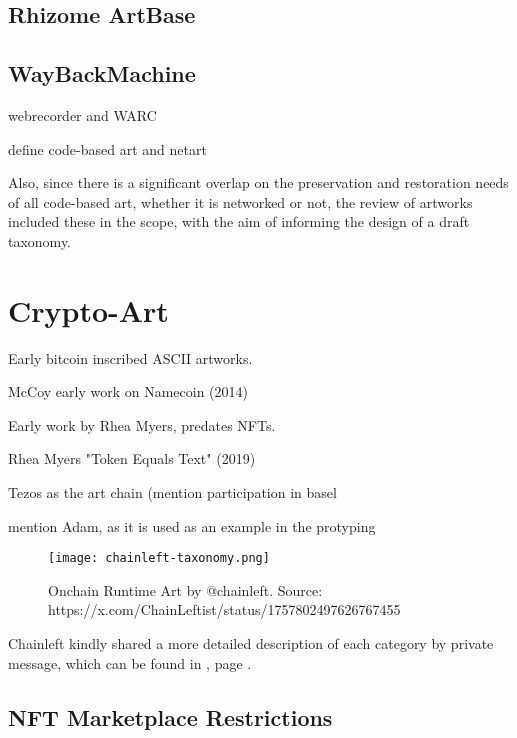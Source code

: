 \subsection{Rhizome ArtBase}


\subsection{WayBackMachine}

webrecorder and WARC





\todo define code-based art and netart

Also, since there is a significant overlap on the preservation and restoration needs of all code-based art, whether it is networked or not, the review of artworks included these in the scope, with the aim of informing the design of a draft taxonomy.




\section{Crypto-Art}


Early bitcoin inscribed ASCII artworks.

McCoy early work on Namecoin (2014)

Early work by Rhea Myers, predates NFTs.

Rhea Myers "Token Equals Text" (2019)


Tezos as the art chain (mention participation in basel


\todo mention Adam, as it is used as an example in the protyping


\todo

\begin{figure}[h]
    \centering
    \texttt{[image: chainleft-taxonomy.png]}
    \caption[Onchain Runtime Art]{Onchain Runtime Art by @chainleft. Source: https://x.com/ChainLeftist/status/1757802497626767455}
    \label{fig:onchainruntimeart}
\end{figure}


Chainleft kindly shared a more detailed description of each category by private message, which can be found in , page \pageref{appx:chainleft-taxonomy}.


\subsection{NFT Marketplace Restrictions}

